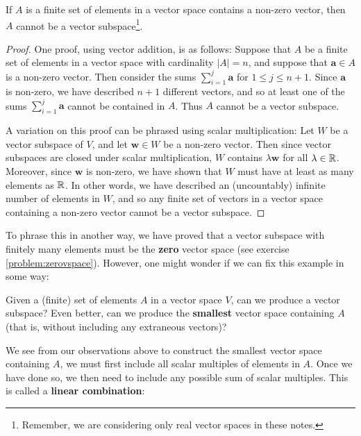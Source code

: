     \begin{example}
    \vspace{-1em}
    \begin{proposition}
    If $A$ is a finite set of elements in a vector space contains a non-zero vector, then $A$ cannot be a vector subspace\footnote{Remember, we are considering only real vector spaces in these notes.}.  
    \end{proposition}
    \end{example}
    
    \begin{proof}
    One proof, using vector addition, is as follows:  Suppose that $A$ be a finite set of elements in a vector space with cardinality $|A|=n$, and suppose that $\bm{a} \in A$ is a non-zero vector.  Then consider the sums $\sum_{i=1}^j\bm{a}$ for $1 \leq j \leq n+1$.  Since $\bm{a}$ is non-zero, we have described $n+1$ different vectors, and so at least one of the sums $\sum_{i=1}^j\bm{a}$ cannot be contained in $A$.  Thus $A$ cannot be a vector subspace.  
    
    A variation on this proof can be phrased using scalar multiplication: Let $W$ be a vector subspace of $V$, and let $\bm{w} \in W$ be a non-zero vector.  Then since vector subspaces are closed under scalar multiplication, $W$ contains $\lambda \bm{w}$ for all $\lambda \in \mathbb{R}$.  Moreover, since $\bm{w}$ is non-zero, we have shown that $W$ must have at least as many elements as $\mathbb{R}$.  In other words, we have described an (uncountably) infinite number of elements in $W$, and so any finite set of vectors in a vector space containing a non-zero vector cannot be a vector subspace.
        
    \end{proof}
    

    To phrase this in another way, we have proved that a vector subspace with finitely many elements must be the \textbf{zero} vector space (see exercise \ref{problem:zerovspace}).  However, one might wonder if we can fix this example in some way:

    \begin{motivating}
      Given a (finite) set of elements $A$ in a vector space $V$, can we produce a vector subspace?  Even better, can we produce the \textbf{smallest} vector space containing $A$ (that is, without including any extraneous vectors)?
    \end{motivating}
    
    We see from our observations above to construct the smallest vector space containing $A$, we must first include all scalar multiples of elements in $A$.  Once we have done so, we then need to include any possible sum of scalar multiples.  This is called a \textbf{linear combination}:
    
